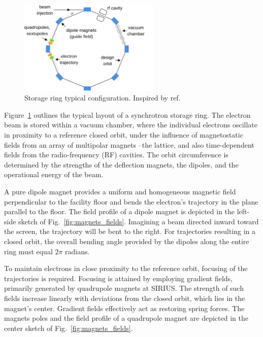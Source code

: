 \begin{figure}[tb]
    \centering
    \includegraphics[width=0.6\textwidth]{Images/storage_ring.png}
    \caption[Storage ring typical configuration.]{Storage ring typical configuration. Inspired by ref.~\cite{sands_physics_1969}}
    \label{fig:storage_ring}
\end{figure}
Figure~\ref{fig:storage_ring} outlines the typical layout of a synchrotron storage ring. The electron beam is stored within a vacuum chamber, where the individual electrons oscillate in proximity to a reference closed orbit, under the influence of magnetostatic fields from an array of multipolar magnets --the lattice, and also time-dependent fields from the radio-frequency (RF) cavities. The orbit circumference is determined by the strengths of the deflection magnets, the dipoles, and the operational energy of the beam.

A pure dipole magnet provides a uniform and homogeneous magnetic field perpendicular to the facility floor and bends the electron's trajectory in the plane parallel to the floor. The field profile of a dipole magnet is depicted in the left-side sketch of Fig.~\ref{fig:magnets_fields}. Imagining a beam directed inward toward the screen, the trajectory will be bent to the right. For trajectories resulting in a closed orbit, the overall bending angle provided by the dipoles along the entire ring must equal $2\pi$ radians.

To maintain electrons in close proximity to the reference orbit, focusing of the trajectories is required. Focusing is attained by employing gradient fields, primarily generated by quadrupole magnets at SIRIUS. The strength of such fields increase linearly with deviations from the closed orbit, which lies in the magnet's center. Gradient fields effectively act as restoring spring forces. The magnets poles and the field profile of a quadrupole magnet are depicted in the center sketch of Fig.~\ref{fig:magnets_fields}.

